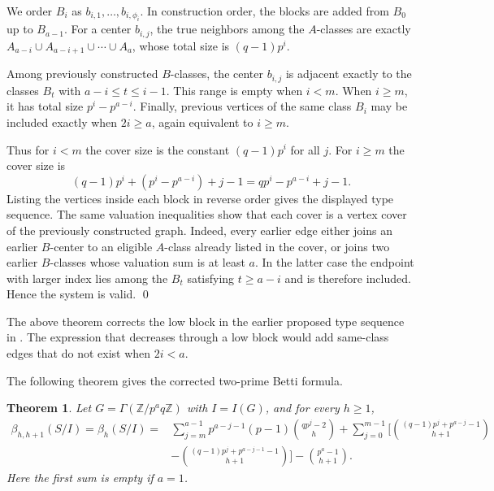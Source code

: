 \documentclass[12pt]{article}
\newtheorem{theorem}{Theorem}[section]
\theoremstyle{definition}
\renewenvironment{proof}{{\bf \noindent Proof.}}{\qed}
\begin{document}
\begin{proof}
We order $B_i$ as $b_{i,1},\ldots,b_{i,\phi_i}$.  In construction order, the blocks are added from $B_0$ up to $B_{a-1}$.  For a center $b_{i,j}$, the true neighbors among the $A$-classes are exactly $A_{a-i}\cup A_{a-i+1}\cup\cdots\cup A_a$, whose total size is $(q-1)p^i$.

\medskip

Among previously constructed $B$-classes, the center $b_{i,j}$ is adjacent exactly to the classes $B_t$ with $a-i\leq t\leq i-1$.  This range is empty when $i<m$.  When $i\geq m$, it has total size $p^i-p^{a-i}$.  Finally, previous vertices of the same class $B_i$ may be included exactly when $2i\geq a$, again equivalent to $i\geq m$.

\medskip

Thus for $i<m$ the cover size is the constant $(q-1)p^i$ for all $j$.  For $i\geq m$ the cover size is
$$
(q-1)p^i+(p^i-p^{a-i})+j-1=qp^i-p^{a-i}+j-1.
$$
Listing the vertices inside each block in reverse order gives the displayed type sequence.  The same valuation inequalities show that each cover is a vertex cover of the previously constructed graph.  Indeed, every earlier edge either joins an earlier $B$-center to an eligible $A$-class already listed in the cover, or joins two earlier $B$-classes whose valuation sum is at least $a$. In the latter case the endpoint with larger index lies among the $B_t$ satisfying $t\geq a-i$ and is therefore included.  Hence the system is valid.
\end{proof}

\medskip

The above theorem corrects the low block in the earlier proposed type sequence in \cite{DungVu2026}.  The expression that decreases through a low block would add same-class edges that do not exist when $2i<a$.

\medskip

\noindent The following theorem gives the corrected two-prime Betti formula.
\begin{theorem}\label{thm:two-prime-betti}
Let $G=\Gamma(\mathbb{Z}/p^a q\mathbb{Z})$  with  $I=I(G)$, and for every $h\geq 1$,
$$
\begin{aligned}
\beta_{h,h+1}(S/I)=\beta_h(S/I)
=&\sum_{j=m}^{a-1}p^{a-j-1}(p-1)\binom{qp^j-2}{h}  +\sum_{j=0}^{m-1}\Bigg[\binom{(q-1)p^j+p^{a-j}-1}{h+1}\\
&-\binom{(q-1)p^j+p^{a-j-1}-1}{h+1}\Bigg]-\binom{p^a-1}{h+1}.
\end{aligned}
$$
Here the first sum is empty if $a=1$.
\end{theorem}
\end{document}
